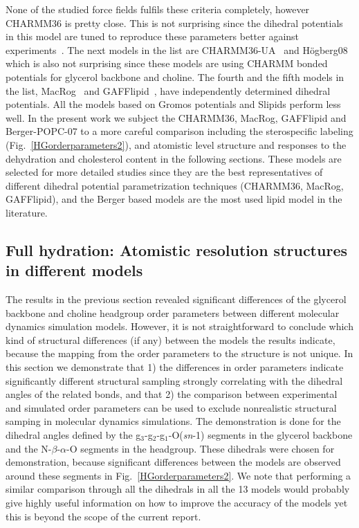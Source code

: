 \documentclass[journal=jacsat,manuscript=article]{achemso}
\begin{document}
None of the studied force fields fulfils these criteria completely, however CHARMM36 is pretty close. 
This is not surprising since the dihedral potentials in this model are tuned to reproduce these parameters better against experiments~\cite{klauda10}.
The next models in the list are CHARMM36-UA~\cite{henin08,lee14} and H\"ogberg08~\cite{hogberg08} which is also not surprising since
these models are using CHARMM bonded potentials for glycerol backbone and choline. The fourth and the fifth models in the list, MacRog~\cite{maciejewski14} and
GAFFlipid~\cite{dickson12}, have independently determined dihedral potentials. All the models based on Gromos potentials and Slipids perform less well.
In the present work we subject the CHARMM36, MacRog, GAFFlipid and Berger-POPC-07 to a more careful comparison including the sterospecific labeling  
(Fig.~\ref{HGorderparameters2}), and atomistic level structure and responses to the dehydration and cholesterol content in the following sections.
These models are selected for more detailed studies since they are the best representatives of different dihedral potential parametrization techniques 
(CHARMM36, MacRog, GAFFlipid), and the Berger based models are the most used lipid model in the literature.


\subsection{Full hydration: Atomistic resolution structures in different models}

The results in the previous section revealed significant differences of the glycerol backbone and choline headgroup
order parameters between different molecular dynamics simulation models.
However, it is not straightforward to conclude which kind of structural differences (if any)
between the models the results indicate, because the mapping from the order parameters to the 
structure is not unique. In this section we demonstrate that 1) the differences in order parameters
indicate significantly different structural sampling strongly correlating with the dihedral angles of the related bonds,
and that 2) the comparison between experimental and simulated order parameters can be used to exclude
nonrealistic structural samping in molecular dynamics simulations. The demonstration is done for 
the dihedral angles defined by the g$_3$-g$_2$-g$_1$-O(\textit{sn}-1) segments in the glycerol backbone and 
the N-$\beta$-$\alpha$-O segments in the headgroup. These dihedrals were chosen for demonstration, because 
significant differences between the models are observed around these segments in Fig.~\ref{HGorderparameters2}.
We note that performing a similar comparison through all the dihedrals in all the 13 models would probably give highly useful
information on how to improve the accuracy of the models yet this is beyond the scope of the current report. 
\end{document}
